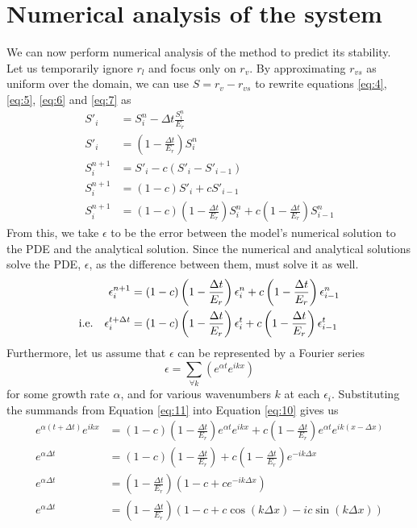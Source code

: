\documentclass[11pt]{article}
\begin{document}
\section{Numerical analysis of the system}
We can now perform numerical analysis of the method to predict its stability. \\
Let us temporarily ignore $r_l$ and focus only on $r_v$. By approximating $r_{vs}$ as uniform over the domain, we can use $S=r_v-r_{vs}$ to rewrite equations \ref{eq:4}, \ref{eq:5}, \ref{eq:6} and \ref{eq:7} as
\begin{align}
S'_i &= S^n_i - \Delta t\frac{S^n_i}{E_r}		\nonumber \\
S'_i &= \left(1-\frac{\Delta t}{E_r}\right)S^n_i	\nonumber \\
S^{n+1}_i &= S'_i - c\left(S'_i - S'_{i-1}\right)		\nonumber \\
S^{n+1}_i &= \left(1-c\right)S'_i + cS'_{i-1}		\nonumber \\
S^{n+1}_i &= \left(1-c\right)\left(1-\frac{\Delta t}{E_r}\right)S^n_i + c\left(1-\frac{\Delta t}{E_r}\right)S^n_{i-1}	\label{eq:9}
\end{align}
From this, we take $\epsilon$ to be the error between the model's numerical solution to the PDE and the analytical solution. Since the numerical and analytical solutions solve the PDE, $\epsilon$, as the difference between them, must solve it as well.
\begin{align} \nonumber
\epsilon^{n+1}_i &= \left(1-c\right)\left(1-\frac{\Delta t}{E_r}\right)\epsilon^n_i + c\left(1-\frac{\Delta t}{E_r}\right)\epsilon^n_{i-1} \\
\label{eq:10} \text{i.e.\quad}
\epsilon^{t+\Delta t}_i &= \left(1-c\right)\left(1-\frac{\Delta t}{E_r}\right)\epsilon^t_i
+ c\left(1-\frac{\Delta t}{E_r}\right)\epsilon^t_{i-1}
\end{align}
Furthermore, let us assume that $\epsilon$ can be represented by a Fourier series
\begin{equation} \label{eq:11}
\epsilon = \sum_{\forall k}\left(e^{\alpha t}e^{ikx}\right)
\end{equation}
for some growth rate $\alpha$, and for various wavenumbers $k$ at each $\epsilon_i$. Substituting the summands from Equation \ref{eq:11} into Equation \ref{eq:10} gives us
\begin{align}
e^{\alpha\left(t+\Delta t\right)}e^{ikx}
&= \left(1-c\right)\left(1-\frac{\Delta t}{E_r}\right)e^{\alpha t}e^{ikx}
+ c\left(1-\frac{\Delta t}{E_r}\right)e^{\alpha t}e^{ik\left(x-\Delta x\right)} \nonumber\\
e^{\alpha\Delta t}
&= \left(1-c\right)\left(1-\frac{\Delta t}{E_r}\right)
+ c\left(1-\frac{\Delta t}{E_r}\right)e^{-ik\Delta x} \nonumber\\
e^{\alpha\Delta t}
&= \left(1-\frac{\Delta t}{E_r}\right)\left(1-c+ce^{-ik\Delta x}\right) \nonumber\\
e^{\alpha\Delta t}
&= \left(1-\frac{\Delta t}{E_r}\right)\left(1-c+c\cos\left(k\Delta x\right)-ic\sin\left(k\Delta x\right)\right)		\label{eq:g_def}
\end{align}
\end{document}
